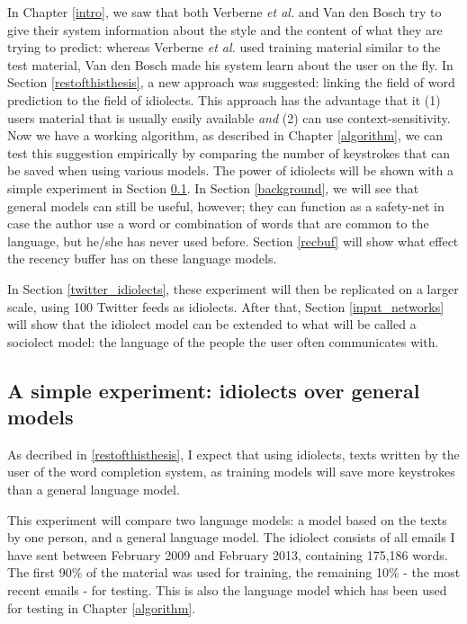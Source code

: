 \documentclass[11pt]{article}
\begin{document}
In Chapter \ref{intro}, we saw that both Verberne {\em et al.}  and Van den Bosch  try to give their system information about the style and the content of what they are trying to predict: whereas Verberne {\em et al.}  used training material similar to the test material, Van den Bosch  made his system learn about the user on the fly. In Section \ref{restofthisthesis}, a new approach was suggested: linking the field of word prediction to the field of idiolects. This approach has the advantage that it (1) users material that is usually easily available \emph{and} (2) can use context-sensitivity. Now we have a working algorithm, as described in Chapter \ref{algorithm}, we can test this suggestion empirically by comparing the number of keystrokes that can be saved when using various models. The power of idiolects will be shown with a simple experiment in Section \ref{simple_exp}. In Section \ref{background}, we will see that general models can still be useful, however; they can function as a safety-net in case the author use a word or combination of words that are common to the language, but he/she has never used before. Section \ref{recbuf} will show what effect the recency buffer has on these language models.

In Section \ref{twitter_idiolects}, these experiment will then be replicated on a larger scale, using 100 Twitter feeds as idiolects. After that, Section \ref{input_networks} will show that the idiolect model can be extended to what will be called a sociolect model: the language of the people the user often communicates with.

\subsection{A simple experiment: idiolects over general models} \label{simple_exp}

As decribed in \ref{restofthisthesis}, I expect that using idiolects, texts written by the user of the word completion system, as training models will save more keystrokes than a general language model.

This experiment will compare two language models: a model based on the texts by one person, and a general language model. The idiolect consists of all emails I have sent between February 2009 and February 2013, containing 175,186 words. The first 90\% of the material was used for training, the remaining 10\% - the most recent emails - for testing. This is also the language model which has been used for testing in Chapter \ref{algorithm}. 
\end{document}
